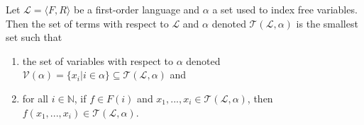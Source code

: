 
\begin{definition}[Term]\label{def:term}
    \leanok
    Let $\mathcal{L} = \langle F, R \rangle$ be a first-order language and $\alpha$ a set used to index free variables. Then the set of terms with respect to $\mathcal{L}$ and $\alpha$ denoted $\mathcal{T}(\mathcal{L},\alpha)$ is the smallest set such that
        \begin{enumerate}
            \item the set of variables with respect to $\alpha$ denoted $\mathcal{V}(\alpha) = \{x_i | i \in \alpha\} \subseteq \mathcal{T}(\mathcal{L},\alpha)$ and
            \item for all $i \in \mathbb{N}$, if $f \in F(i)$ and $x_1,...,x_i \in \mathcal{T}(\mathcal{L},\alpha)$, then $f(x_1,...,x_i) \in \mathcal{T}(\mathcal{L},\alpha)$.
        \end{enumerate}
\end{definition}

